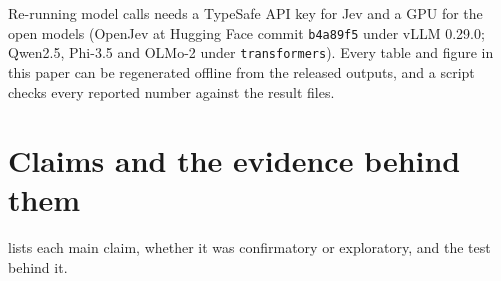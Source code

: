  Re-running model calls needs a TypeSafe API key
for Jev and a GPU for the open models (OpenJev at Hugging Face commit
\texttt{b4a89f5} under vLLM 0.29.0; Qwen2.5, Phi-3.5 and OLMo-2 under
\texttt{transformers}). Every table and figure in this paper can be
regenerated offline from the released outputs, and a script checks every
reported number against the result files.

\section{Claims and the evidence behind them}

 lists each main claim, whether it was confirmatory or
exploratory, and the test behind it.

